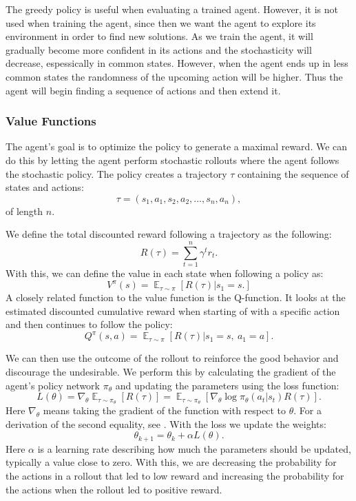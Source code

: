 \documentclass[12pt,A4]{report}
\theoremstyle{definition}
\begin{document}
The greedy policy is useful when evaluating a trained agent. However, it is not used when training the agent, since then we want the agent to explore its environment in order to find new solutions. As we train the agent, it will gradually become more confident in its actions and the stochasticity will decrease, espessically in common states. However, when the agent ends up in less common states the randomness of the upcoming action will be higher. Thus the agent will begin finding a sequence of actions and then extend it.
\subsubsection{Value Functions}

The agent's goal is to optimize the policy to generate a maximal reward. We can do this by letting the agent perform stochastic rollouts where the agent follows the stochastic policy. The policy creates a trajectory $\tau$ containing the sequence of states and actions:
\[ \tau = (s_1, a_1, s_2, a_2, \dots , s_n, a_n),\]
of length $n$.

We define the total discounted reward following a trajectory as the following:
\[ R(\tau) = \sum_{t=1}^n \gamma^t r_t.\]
With this, we can define the value in each state when following a policy as:
\[ V^\pi(s) = \mathop{\mathbb{E}}_{\tau \sim \pi} [R(\tau) | s_1 = s.]\]
A closely related function to the value function is the Q-function. It looks at the estimated discounted cumulative reward when starting of with a specific action and then continues to follow the policy:
\[ Q^\pi(s, a) = \mathop{\mathbb{E}}_{\tau \sim \pi} [R(\tau) | s_1 = s, \ a_1 = a].\]

We can then use the outcome of the rollout to reinforce the good behavior and discourage the undesirable. We perform this by calculating the gradient of the agent's policy network $\pi_\theta$ and updating the parameters using the loss function:
\[ L(\theta) = \nabla_\theta \mathop{\mathbb{E}}_{\tau \sim \pi_\theta}[R(\tau)] = \mathop{\mathbb{E}}_{\tau \sim \pi_\theta} [\nabla_\theta \log \pi_\theta (a_t|s_t) R(\tau) ]. \]
Here $\nabla_\theta$ means taking the gradient of the function with respect to $\theta$. For a derivation of the second equality, see \citet{OpenAI}. With the loss we update the weights:
\[ \theta_{k+1} = \theta_k + \alpha L(\theta).\]
Here $\alpha$ is a learning rate describing how much the parameters should be updated, typically a value close to zero. With this, we are decreasing the probability for the actions in a rollout that led to low reward and increasing the probability for the actions when the rollout led to positive reward.
\end{document}
